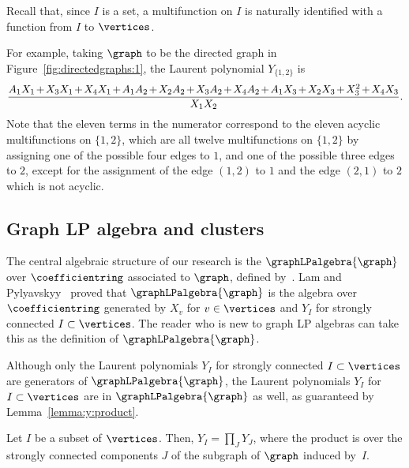 Recall that, since \(I\) is a set, a multifunction on \(I\) is naturally identified with a function from \(I\) to \(\vertices\).

For example,
taking \(\graph\) to be the directed graph in Figure~\ref{fig:directedgraphs:1},
the Laurent polynomial \(Y_{\{1, 2\}}\) is
\begin{equation*}
    \medmuskip=2mu
    \frac{
        A_1X_1 + X_3X_1 + X_4X_1 +
        A_1A_2 + X_2A_2 + X_3A_2 + X_4A_2 +
        A_1X_3 + X_2X_3 + X_3^2  + X_4X_3
    }{X_1X_2}.
\end{equation*}
Note that the eleven terms in the numerator correspond to the eleven acyclic multifunctions on \(\{1, 2\}\),
which are all twelve multifunctions on \(\{1, 2\}\) by assigning one of the possible four edges to \(1\),
and one of the possible three edges to \(2\),
except for the assignment of the edge \((1, 2)\) to \(1\) and the edge \((2, 1)\) to \(2\) which is not acyclic.

\subsection{Graph LP algebra and clusters} \label{subsection:graphLPalgebraandclusters}

The central algebraic structure of our research is the  \(\graphLPalgebra{\graph}\) over \(\coefficientring\) associated to \(\graph\), defined by~\cite{linearLP}.
Lam and Pylyavskyy~\cite{linearLP} proved that \(\graphLPalgebra{\graph}\) is the algebra over \(\coefficientring\) generated by 
\(X_v\) for \(v \in \vertices\) and \(Y_I\) for strongly connected \(I \subset \vertices\).
The reader who is new to graph LP algebras can take this as the definition of \(\graphLPalgebra{\graph}\).

Although only the Laurent polynomials \(Y_I\) for strongly connected \(I \subset \vertices\) are generators of \(\graphLPalgebra{\graph}\),
the Laurent polynomials \(Y_I\) for \(I \subset \vertices\) are in \(\graphLPalgebra{\graph}\) as well, as guaranteed by Lemma~\ref{lemma:y:product}.

\begin{lemm} \label{lemma:y:product}
    Let \(I\) be a subset of \(\vertices\).
    Then, \(Y_I = \prod_{J} Y_J\), where the product is over the strongly connected components \(J\) of the subgraph of \(\graph\) induced by~\(I\).
\end{lemm}

